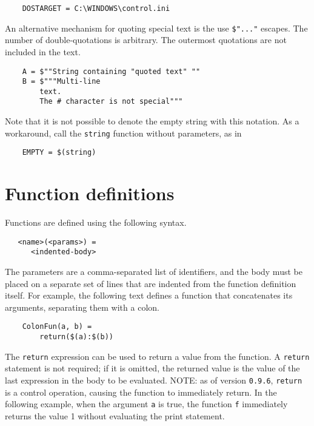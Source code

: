 \begin{verbatim}
    DOSTARGET = C:\WINDOWS\control.ini
\end{verbatim}

An alternative mechanism for quoting special text is the use \verb+$"..."+ escapes.  The number of
double-quotations is arbitrary.  The outermost quotations are not included in the text.

\begin{verbatim}
    A = $""String containing "quoted text" ""
    B = $"""Multi-line
        text.
        The # character is not special"""
\end{verbatim}

Note that it is not possible to denote the empty string with this notation.
As a workaround, call the \verb+string+ function without parameters, as in

\begin{verbatim}
    EMPTY = $(string)
\end{verbatim}

\section{Function definitions}
\label{section:functions}

Functions are defined using the following syntax.

\begin{verbatim}
   <name>(<params>) =
      <indented-body>
\end{verbatim}

The parameters are a comma-separated list of identifiers, and the body must be placed on a separate
set of lines that are indented from the function definition itself.  For example, the following text
defines a function that concatenates its arguments, separating them with a colon.

\begin{verbatim}
    ColonFun(a, b) =
        return($(a):$(b))
\end{verbatim}

%
The \verb+return+ expression can be used to return a value from the function.  A \verb+return+
statement is not required; if it is omitted, the returned value is the value of the last expression
in the body to be evaluated.  NOTE: as of version \verb+0.9.6+, \verb+return+ is a control
operation, causing the function to immediately return.  In the following example, when the argument
\verb+a+ is true, the function \verb+f+ immediately returns the value 1 without evaluating the print
statement.

